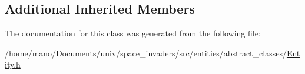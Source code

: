 \subsection*{Additional Inherited Members}


The documentation for this class was generated from the following file\+:\begin{DoxyCompactItemize}
\item 
/home/mano/\+Documents/univ/space\+\_\+invaders/src/entities/abstract\+\_\+classes/\hyperlink{Entity_8h}{Entity.\+h}\end{DoxyCompactItemize}
